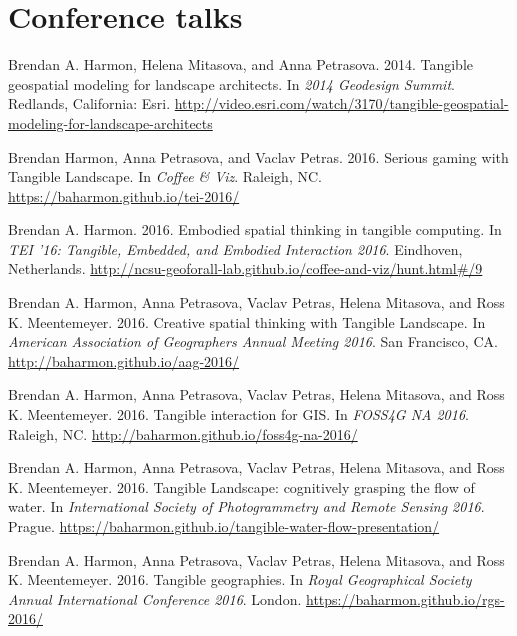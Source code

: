 \chapter{Conference talks}
\label{app-e}



Brendan A. Harmon, Helena Mitasova, and Anna Petrasova. 2014. Tangible geospatial modeling for landscape architects. In \emph{2014 Geodesign Summit}. Redlands, California: Esri.
\url{http://video.esri.com/watch/3170/tangible-geospatial-modeling-for-landscape-architects}

Brendan Harmon, Anna Petrasova, and Vaclav Petras. 2016. Serious gaming with Tangible Landscape. In \emph{Coffee \& Viz}. Raleigh, NC.
\url{https://baharmon.github.io/tei-2016/}

Brendan A. Harmon. 2016. Embodied spatial thinking in tangible computing. In \emph{TEI ’16: Tangible, Embedded, and Embodied Interaction 2016}. Eindhoven, Netherlands.
\url{http://ncsu-geoforall-lab.github.io/coffee-and-viz/hunt.html\#/9}

Brendan A. Harmon, Anna Petrasova, Vaclav Petras, Helena Mitasova, and Ross K. Meentemeyer. 2016. Creative spatial thinking with Tangible Landscape. In \emph{American Association of Geographers Annual Meeting 2016}. San Francisco, CA.
\url{http://baharmon.github.io/aag-2016/}

Brendan A. Harmon, Anna Petrasova, Vaclav Petras, Helena Mitasova, and Ross K. Meentemeyer. 2016. Tangible interaction for GIS. In \emph{FOSS4G NA 2016}. Raleigh, NC.
\url{http://baharmon.github.io/foss4g-na-2016/}

Brendan A. Harmon, Anna Petrasova, Vaclav Petras, Helena Mitasova, and Ross K. Meentemeyer. 2016. Tangible Landscape: cognitively grasping the flow of water. In \emph{International Society of Photogrammetry and Remote Sensing 2016}. Prague.
\url{https://baharmon.github.io/tangible-water-flow-presentation/}

Brendan A. Harmon, Anna Petrasova, Vaclav Petras, Helena Mitasova, and Ross K. Meentemeyer. 2016. Tangible geographies. In \emph{Royal Geographical Society Annual International Conference 2016}. London.
\url{https://baharmon.github.io/rgs-2016/}

%
%
%


\vfil
\pagebreak



